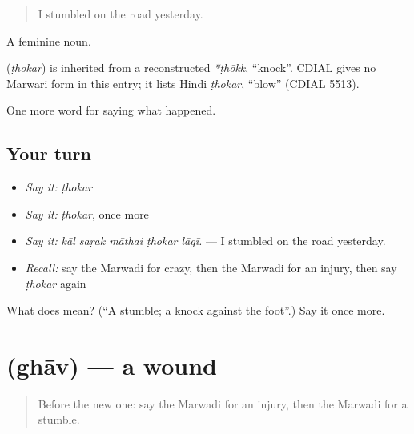\begin{quote}
I stumbled on the road yesterday.
\end{quote}

A feminine noun.

\begin{cousinweb}
\textbf{} (\emph{ṭhokar}) is inherited from a reconstructed \emph{*ṭhōkk}, \textquotedblleft{}knock\textquotedblright{}. CDIAL gives no Marwari form in this entry; it lists Hindi \emph{ṭhokar}, \textquotedblleft{}blow\textquotedblright{} (CDIAL 5513).
\end{cousinweb}

\begin{grammarlens}[title={What you've built}]
One more word for saying what happened.
\end{grammarlens}

\subsection*{Your turn}
\begin{itemize}
\raggedright
  \item \emph{Say it:} \emph{ṭhokar}
  \item \emph{Say it:} \emph{ṭhokar}, once more
  \item \emph{Say it:} \emph{kāl saṛak māthai ṭhokar lāgī.} — I stumbled on the road yesterday.
  \item \emph{Recall:} say the Marwadi for crazy, then the Marwadi for an injury, then say \emph{ṭhokar} again
\end{itemize}

\begin{tcolorbox}[breakable,colback=teal!4,colframe=teal!35!black,title={Before you move on}]
What does  mean? (\textquotedblleft{}A stumble; a knock against the foot\textquotedblright{}.) Say it once more.
\end{tcolorbox}
\section[\texorpdfstring{\mw{घाव} (ghāv)}{घाव (ghāv)}]{ (ghāv) — a wound}

\label{lesson:MW-C241-ghav}



\begin{quote}
Before the new one: say the Marwadi for an injury, then the Marwadi for a stumble.
\end{quote}

